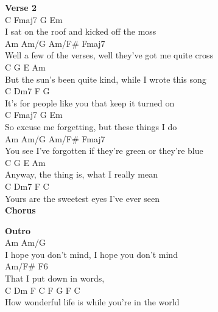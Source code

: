 \documentclass[a4paper]{article}
\begin{document}
{{        }
        \textbf{Verse 2}
        ~\\
        {
            \cutive
            \obeyspaces
C             Fmaj7 G                    Em
\\
I sat on the roof     and kicked off the moss
\\
        Am          Am/G              Am/F\#           Fmaj7
\\
Well a few of the verses, well they've got me quite cross
\\
C                    G        E                   Am
\\
But the sun's been quite kind, while I wrote this song
\\
C                    Dm7     F                G
\\
It's for people like you that keep it turned on
\\
C                Fmaj7   G                  Em
\\
So excuse me forgetting,  but these things I do
\\
Am               Am/G              Am/F\#             Fmaj7
\\
You see I've forgotten if they're green or they're blue
\\
C                  G                  E         Am
\\
Anyway, the thing is, what I really mean
\\
C               Dm7        F              C
\\
Yours are the sweetest eyes I've ever seen
\\

        }
        \textbf{Chorus}
        ~\\
        {
            \cutive
            \obeyspaces

        }
        \textbf{Outro}
        ~\\
        {
            \cutive
            \obeyspaces
Am                   Am/G
\\
I hope you don't mind, I hope you don't mind
\\
Am/F\#                F6
\\
That I put down in words,
\\
     C         Dm            F             C       F   G   F   C
\\
How wonderful life is while you're in the world\\

        }
    }
    \pagebreak
\end{document}
